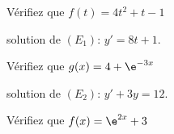 \begin{exercice_cours}{}
\begin{minipage}{0.30\linewidth}
	Vérifiez que $f(t)=4t^2+t-1$ 
	
	solution de $(E_1): \, y'=8t+1$.

	\medskip

	\dotfill{}

	\medskip{}

	\dotfill{}

	\medskip

	\dotfill{}

	\medskip

	\dotfill{}

	\medskip
	
	\dotfill{}

	\medskip
	
	\dotfill{}

	\medskip
	
	\dotfill{}

	\medskip
	
	\dotfill{}

	\medskip
	
	\dotfill{}

\end{minipage}\hfill{}
\begin{minipage}{0.30\linewidth}
		Vérifiez que $g(x)=4+\e^{-3x}$ 
		
		solution de $(E_2): \, y'+3y=12$.

		
	\medskip

	\dotfill{}

	\medskip{}

	\dotfill{}

	\medskip

	\dotfill{}

	\medskip

	\dotfill{}

	\medskip
	
	\dotfill{}

	\medskip
	
	\dotfill{}

	\medskip
	
	\dotfill{}

	\medskip
	
	\dotfill{}

	\medskip
	
	\dotfill{}
\end{minipage}\hfill{}
\begin{minipage}{0.30\linewidth}
		Vérifiez que $f(x)=\e^{2x}+3$ 
		

\end{minipage}
\end{exercice_cours}
